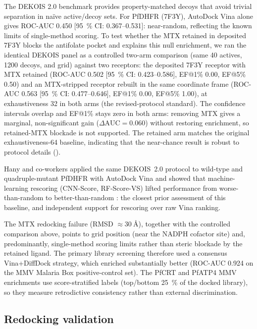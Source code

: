 \documentclass[journal=jcisd8,manuscript=suppinfo]{achemso}
\begin{document}
The DEKOIS 2.0 benchmark \cite{Bauer2013} provides property-matched decoys that avoid trivial separation in na\"ive active/decoy sets. For PfDHFR (7F3Y), AutoDock Vina alone gives ROC-AUC \num{0.450} [\qty{95}{\percent} CI: \numrange{0.367}{0.531}]: near-random, reflecting the known limits of single-method scoring. To test whether the MTX retained in deposited 7F3Y blocks the antifolate pocket and explains this null enrichment, we ran the identical DEKOIS panel as a controlled two-arm comparison (same \num{40} actives, \num{1200} decoys, and grid) against two receptors: the deposited 7F3Y receptor with MTX retained (ROC-AUC \num{0.502} [\qty{95}{\percent} CI: \numrange{0.423}{0.586}], EF@1\% \num{0.00}, EF@5\% \num{0.50}) and an MTX-stripped receptor rebuilt in the same coordinate frame (ROC-AUC \num{0.563} [\qty{95}{\percent} CI: \numrange{0.477}{0.646}], EF@1\% \num{0.00}, EF@5\% \num{1.00}), at exhaustiveness \num{32} in both arms (the revised-protocol standard). The confidence intervals overlap and EF@1\% stays zero in both arms: removing MTX gives a marginal, non-significant gain ($\Delta\mathrm{AUC} = \num{+0.060}$) without restoring enrichment, so retained-MTX blockade is not supported. The retained arm matches the original exhaustiveness-\num{64} baseline, indicating that the near-chance result is robust to protocol details ().

Hany and co-workers applied the same DEKOIS~2.0 protocol to wild-type and quadruple-mutant PfDHFR with AutoDock Vina and showed that machine-learning rescoring (CNN-Score, RF-Score-VS) lifted performance from worse-than-random to better-than-random \cite{hany2025dekois}: the closest prior assessment of this baseline, and independent support for rescoring over raw Vina ranking.

The MTX redocking failure (RMSD $\approx \qty{30}{\angstrom}$), together with the controlled comparison above, points to grid position (near the NADPH cofactor site) and, predominantly, single-method scoring limits rather than steric blockade by the retained ligand. The primary library screening therefore used a consensus Vina+DiffDock strategy, which enriched substantially better (ROC-AUC \num{0.924} on the MMV Malaria Box positive-control set). The PfCRT and PfATP4 MMV enrichments use score-stratified labels (top/bottom \qty{25}{\percent} of the docked library), so they measure retrodictive consistency rather than external discrimination.

\subsection{Redocking validation}\label{sec:sm_val_redock}

\end{document}
